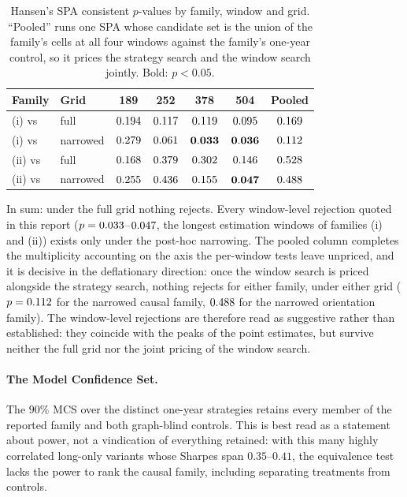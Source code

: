 \begin{table}[t]
  \centering
  \caption{Hansen's SPA consistent $p$-values by family, window and
    grid. ``Pooled'' runs one SPA whose candidate set is the union of
    the family's cells at all four windows against the family's one-year
    control, so it prices the strategy search and the window search
    jointly. Bold: $p<0.05$.}
  \label{tab:spa}
  \small
  \begin{tabular}{l l c c c c c}
    \toprule
    Family & Grid & 189 & 252 & 378 & 504 & Pooled \\
    \midrule
    (i) vs \HRP{}      & full     & $0.194$ & $0.117$ & $0.119$ & $0.095$ & $0.169$ \\
    (i) vs \HRP{}      & narrowed & $0.279$ & $0.061$ & $\mathbf{0.033}$ & $\mathbf{0.036}$ & $0.112$ \\
    (ii) vs \skelsamp{} & full     & $0.168$ & $0.379$ & $0.302$ & $0.146$ & $0.528$ \\
    (ii) vs \skelsamp{} & narrowed & $0.255$ & $0.436$ & $0.155$ & $\mathbf{0.047}$ & $0.488$ \\
    \bottomrule
  \end{tabular}
\end{table}

In sum: under the full grid nothing rejects. Every
window-level rejection quoted in this report
($p=0.033$--$0.047$, the longest estimation windows of
families (i) and (ii)) exists only under the post-hoc narrowing.
The pooled column completes the multiplicity accounting on the axis the
per-window tests leave unpriced, and it is decisive in the deflationary
direction: once the window search is priced alongside the strategy
search, nothing rejects for either family, under either grid
($p=0.112$ for the narrowed causal family,
$0.488$ for the narrowed orientation family). The
window-level rejections are therefore read as
suggestive rather than established: they coincide with the peaks of
the point estimates, but survive neither the full grid nor the joint
pricing of the window search.

\paragraph{The Model Confidence Set.} The $90\%$ MCS over the
distinct one-year strategies retains every member of the reported
family and both graph-blind controls. This is best read as a statement
about
power, not a vindication of everything retained: with this many highly
correlated long-only variants whose Sharpes span $0.35$--$0.41$, the
equivalence test lacks the power to rank the causal family, including
separating treatments from controls.

